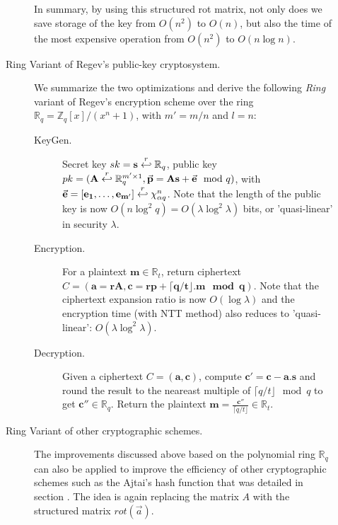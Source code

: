 \begin{description}
\begin{description}
            In summary, by using this structured rot matrix, not only does we
            save storage of the key from $O(n^2)$ to $O(n)$, but also the time
            of the most expensive operation from $O(n^2)$ to $O(n\log n)$.

        \item [Ring Variant of Regev's public-key cryptosystem.] We summarize
            the two optimizations and derive the following \emph{Ring} variant
            of Regev's encryption scheme over the ring $\mathbb{R}_q =
            \mathbb{Z}_q[x]/(x^n + 1)$, with $m' = m/n$ and $l = n$:
            \begin{description}
                \item[KeyGen.] Secret key $sk = \mathbf{s} \stackrel{r}{\hookleftarrow}
                    \mathbb{R}_q$, public key $pk = (\mathbf{A} \stackrel{r}{\hookleftarrow}
                        \mathbb{R}_q^{m' \times 1}, \vec{\mathbf{p}} =
                        \mathbf{As} +
                    \vec{\mathbf{e}} \mod q )$, with $\vec{\mathbf{e}} =
                    [\mathbf{e_1, \dots, e_{m'}}] \stackrel{r}{\hookleftarrow} \chi_{\alpha
                    q}^n$. Note that the length of the public key is now
                    $O(n \log^2 q) = O(\lambda \log^2 \lambda)$ bits, or
                    'quasi-linear' in security $\lambda$.
                \item [Encryption.] For a plaintext $\mathbf{m} \in
                    \mathbb{R}_t$, return ciphertext $C = (\mathbf{a = rA},
                    \mathbf{c = rp + \lceil q/t \rfloor. m \mod q })$. Note that
                    the
                    ciphertext expansion ratio is now $O(\log \lambda)$ and the
                    encryption time (with NTT method) also reduces to 'quasi-linear':
                    $O(\lambda \log^2 \lambda)$.
                \item [Decryption.] Given a ciphertext $C = \mathbf{(a,c)}$,
                    compute $\mathbf{c' = c - a.s}$ and round the result to the
                    neareast multiple of $\lceil q/t \rfloor \mod q$ to get
                    $\mathbf{c''} \in \mathbb{R}_q$. Return the plaintext
                    $\mathbf{m} = \frac{\mathbf{c''}}{\lceil q/t \rfloor} \in
                    \mathbb{R}_t$.
            \end{description}
        \item [Ring Variant of other cryptographic schemes.] The improvements
            discussed above based on the polynomial ring $\mathbb{R}_q$ can also
            be applied to improve the efficiency of other cryptographic schemes
            such as the Ajtai's hash function that was detailed in section
            \missref{}. The idea is again replacing the matrix $A$ with the
            structured matrix $rot(\vec{a})$.


\end{description}
\end{description}
